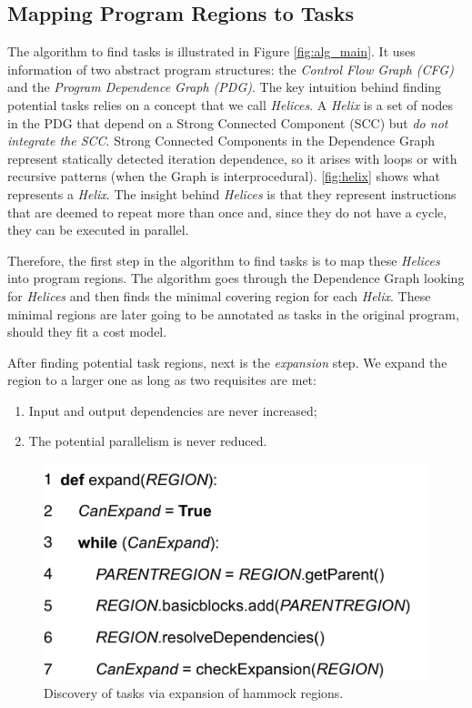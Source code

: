 \documentclass[sigplan,10pt,review,anonymous]{acmart}
\begin{document}
\subsection{Mapping Program Regions to Tasks}
\label{sub:identification}

The algorithm to find tasks is illustrated in Figure \ref{fig:alg_main}. It uses
information of two abstract program structures: the \emph{Control Flow Graph (CFG)} and
the \emph{Program Dependence Graph (PDG)}. The key intuition behind
finding potential tasks relies on a concept that we call \emph{Helices}. A \emph{Helix}
is a set of nodes in the PDG that depend on a Strong Connected Component (SCC) but \emph{do not
integrate the SCC}. Strong Connected Components in the Dependence Graph represent statically
detected iteration dependence, so it arises with loops or with recursive patterns (when the Graph is
interprocedural).  \Figure \ref{fig:helix}  shows what represents a \emph{Helix}.
The insight behind \emph{Helices} is that they represent instructions that are deemed
to repeat more than once and, since they do not have a cycle, they can be executed in parallel.

Therefore, the first step in the algorithm to find tasks is to map these \emph{Helices}
into program regions. The algorithm goes through the Dependence Graph looking for \emph{Helices}
and then finds the minimal covering region for each \emph{Helix}. These minimal regions
are later going to be annotated as tasks in the original program, should they fit a cost model.

After finding potential task regions, next is the \emph{expansion} step. We expand the region to a larger 
one as long as two requisites are met:

\begin{enumerate}  
\item Input and output dependencies are never increased;
\item The potential parallelism is never reduced.
\end{enumerate}


\begin{figure}[t!]
\begin{center}
\includegraphics[width=0.9\columnwidth]{images/expand_alg}
\caption{Discovery of tasks via expansion of hammock regions.}
\label{fig:expand_alg}
\end{center}
\end{figure}
\end{document}
